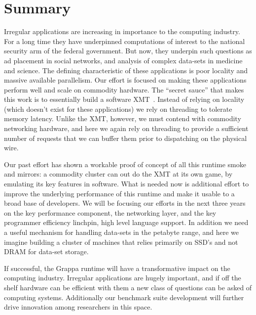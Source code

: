 \section{Summary}

Irregular applications are increasing in importance to the computing industry.  For a long time they have underpinned computations of interest to the national security arm of the federal government.  But now, they underpin such questions as ad placement in social networks, and analysis of complex data-sets in medicine and science.  The defining characteristic of these applications is poor locality and massive available parallelism.  Our effort is focused on making these applications perform well and scale on commodity hardware.  The ``secret sauce'' that makes this work is to essentially build a software XMT~\cite{feo:xmt}.  Instead of relying on locality (which doesn't exist for these applications) we rely on threading to tolerate memory latency.  Unlike the XMT, however, we must contend with commodity networking hardware, and here we again rely on threading to provide a sufficient number of requests that we can buffer them prior to dispatching on the physical wire.

Our past effort has shown a workable proof of concept of all this runtime smoke and mirrors: a commodity cluster can out do the XMT at its own game, by emulating its key features in software.  What is needed now is additional effort to improve the underlying performance of this runtime and make it usable to a broad base of developers.  We will be focusing our efforts in the next three years on the key performance component, the networking layer, and the key programmer efficiency linchpin, high level language support.  In addition we need a useful mechanism for handling data-sets in the petabyte range, and here we imagine building a cluster of machines that relies primarily on SSD's and not DRAM for data-set storage.

If successful, the Grappa runtime will have a transformative impact on the computing industry.  Irregular applications are hugely important, and if off the shelf hardware can be efficient with them a new class of questions can be asked of computing systems.  Additionally our benchmark suite development will further drive innovation among researchers in this space.




